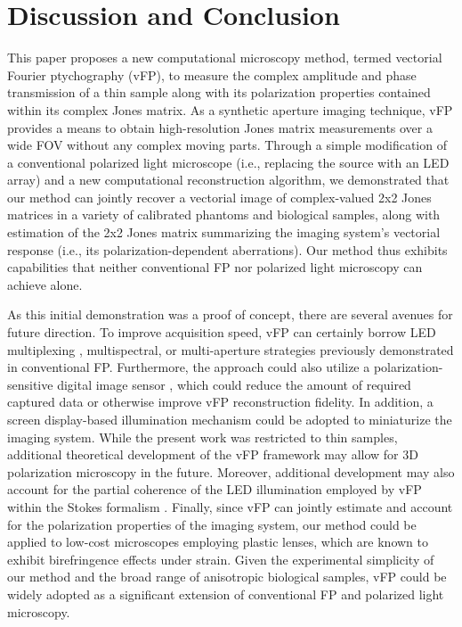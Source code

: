 \documentclass{article}
\begin{document}
\section{Discussion and Conclusion}

This paper proposes a new computational microscopy method, termed vectorial Fourier ptychography (vFP), to measure the complex amplitude and phase transmission of a thin sample along with its polarization properties contained within its complex Jones matrix. As a synthetic aperture imaging technique, vFP provides a means to obtain high-resolution Jones matrix measurements over a wide FOV without any complex moving parts. Through a simple modification of a conventional polarized light microscope (i.e., replacing the source with an LED array) and a new computational reconstruction algorithm, we demonstrated that our method can jointly recover a vectorial image of complex-valued 2x2 Jones matrices in a variety of calibrated phantoms and biological samples, along with estimation of the 2x2 Jones matrix summarizing the imaging system's vectorial response (i.e., its polarization-dependent aberrations). Our method thus exhibits capabilities that neither conventional FP nor polarized light microscopy can achieve alone.

As this initial demonstration was a proof of concept, there are several avenues for future direction. To improve acquisition speed, vFP can certainly borrow LED multiplexing \cite{tian2014multiplexed}, multispectral, \cite{loetgering2021tailoring} or multi-aperture \cite{konda2021multi} strategies previously demonstrated in conventional FP. Furthermore, the approach could also utilize a polarization-sensitive digital image sensor \cite{bai2020pathological,yeh2021upti}, which could reduce the amount of required captured data or otherwise improve vFP reconstruction fidelity. In addition, a screen display-based illumination mechanism could be adopted \cite{lee2021smartphone} to miniaturize the imaging system. While the present work was restricted to thin samples, additional theoretical development of the vFP framework may allow for 3D polarization microscopy \cite{saba2021polarization,yeh2021upti}in the future. Moreover, additional development may also account for the partial coherence of the LED illumination employed by vFP within the Stokes formalism \cite{yeh2021upti}. Finally, since vFP can jointly estimate and account for the polarization properties of the imaging system, our method could be applied to low-cost microscopes employing plastic lenses, which are known to exhibit birefringence effects under strain. Given the experimental simplicity of our method and the broad range of anisotropic biological samples, vFP could be widely adopted as a significant extension of conventional FP and polarized light microscopy.
\end{document}
